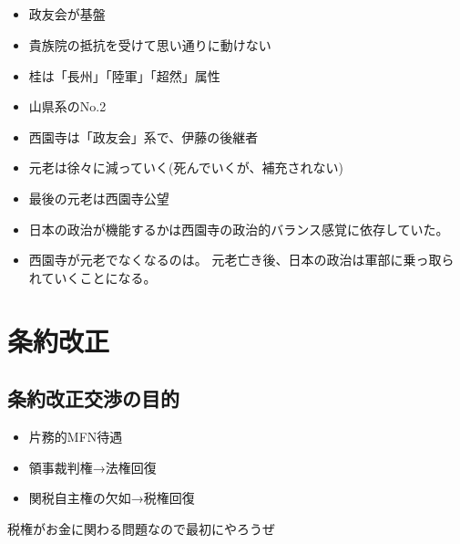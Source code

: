 \documentclass[12pt,fleqn]{ltjsarticle}
\begin{document}

\subsection*{}
\begin{itemize}
\item 政友会が基盤
\item 貴族院の抵抗を受けて思い通りに動けない
\end{itemize}

\begin{itemize}
\item 桂は「長州」「陸軍」「超然」属性
\item 山県系のNo.2
\end{itemize}

\begin{itemize}
\item 西園寺は「政友会」系で、伊藤の後継者
\end{itemize}

\begin{itemize}
\item 元老は徐々に減っていく(死んでいくが、補充されない)
\item 最後の元老は西園寺公望
\item 日本の政治が機能するかは西園寺の政治的バランス感覚に依存していた。
\item 西園寺が元老でなくなるのは。
元老亡き後、日本の政治は軍部に乗っ取られていくことになる。
\end{itemize}

\clearpage
\section{条約改正}
\subsection{条約改正交渉の目的}
\begin{itemize}
\item 片務的MFN待遇
\item 領事裁判権→法権回復
\item 関税自主権の欠如→税権回復
\end{itemize}

税権がお金に関わる問題なので最初にやろうぜ
\end{document}
